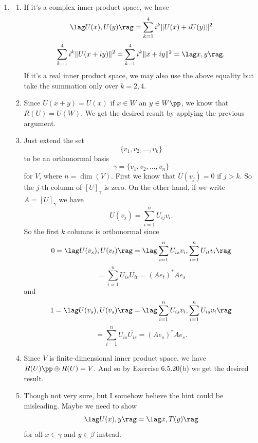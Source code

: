 \begin{enumerate}
\[\|U(v_1+v_2)\|^2=\|v_1-v_2\|^2\]
\[=\|v_1\|^2+\|v_2\|^2=\|v_1+v_2\|^2.\]
To check that $U$ is self-adjoint, for any $v_1,u_1\in W$ and $v_2,u_2\in W^\perp$ verify  
\[\begin{aligned}
    \lag v_1 + v_2, U(u_1 + u_2)\rag &= \lag v_1 + v_2, u_1 - u_2\rag \\
     &= \lag v_1, u_1\rag - \lag v_2, u_2\rag \\
     &= \lag v_1 - v_2, u_1 + u_2\rag = \lag U(v_1 + v_2), u_1 + u_2\rag. \\
\end{aligned}\]
On the other hand, $U$ is a bijection since $UU$ is the identity map.
\item \begin{enumerate}
\item If it's a complex inner product space, we have 
\[\lag U(x),U(y)\rag =\sum_{k=1}^4{i^k\|U(x)+iU(y)\|^2}\]
\[\sum_{k=1}^4{i^k\|U(x+iy)\|^2}=\sum_{k=1}^4{i^k\|x+iy\|^2}=\lag x,y\rag.\]
If it's a real inner product space, we may also use the above equality but take the summation only over $k=2,4$.
\item Since $U(x+y)=U(x)$ if $x\in W$ an $y\in W\pp$, we know that $R(U)=U(W)$. We get the desired result by applying the previous argument.
\item Just extend the set 
\[\{v_1,v_2,\ldots ,v_k\}\] to be an orthonormal basis 
\[\gamma =\{v_1,v_2,\ldots ,v_n\}\]
for $V$, where $n=\dim(V)$. First we know that $U(v_j)=0$ if $j>k$. So the $j$-th column of $[U]_{\gamma}$ is zero. On the other hand, if we write $A=[U]_{\gamma}$ we have 
\[U(v_j)=\sum_{i=1}^n{U_{ij}v_i}.\]
So the first $k$ columns is orthonormal since 
\[0=\lag U(v_s),U(v_t)\rag =\lag \sum_{i=1}^n{U_{is}v_i},\sum_{i=1}^n{U_{it}v_i}\rag \]
\[=\sum_{i=1}^n{U_{is}\overline{U_{it}}}= (Ae_t)^*Ae_s \]
and 
\[1=\lag U(v_s),U(v_s)\rag =\lag \sum_{i=1}^n{U_{is}v_i},\sum_{i=1}^n{U_{is}v_i}\rag \]
\[=\sum_{i=1}^n{U_{is}\overline{U_{is}}}= (Ae_s)^*Ae_s .\]
\item Since $V$ is finite-dimensional inner product space, we have $R(U)\pp\oplus R(U)=V$. And so by Exercise 6.5.20(b) we get the desired result.
\item Though not very sure, but I somehow believe the hint could be misleading.  Maybe we need to show  
\[
    \lag U(x), y\rag = \lag x, T(y)\rag
\]
for all $x\in\gamma$ and $y\in\beta$ instead.  


\end{enumerate}
\end{enumerate}
